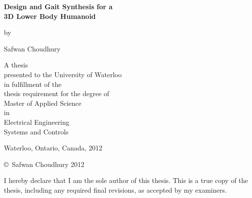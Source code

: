 \pagestyle{empty}


\begin{titlepage}
    \begin{center}
        \vspace*{1.0cm}

        \Huge
        {\bf Design and Gait Synthesis for a \\ 3D Lower Body Humanoid}

        \vspace*{1.0cm}

        \normalsize
        by \\

        \vspace*{1.0cm}

        \Large
        Safwan Choudhury \\

        \vspace*{3.0cm}

        \normalsize
        A thesis \\
        presented to the University of Waterloo \\ 
        in fulfillment of the \\
        thesis requirement for the degree of \\
        Master of Applied Science \\
        in \\
        Electrical Engineering\\
 		Systems and Controls \\

        \vspace*{2.0cm}

        Waterloo, Ontario, Canada, 2012 \\

        \vspace*{1.0cm}

        \copyright\ Safwan Choudhury 2012 \\
    \end{center}
\end{titlepage}

\pagestyle{plain}
\setcounter{page}{2}

\cleardoublepage


\noindent
I hereby declare that I am the sole author of this thesis. 
This is a true copy of the thesis, including any required final revisions, as accepted by my examiners.

